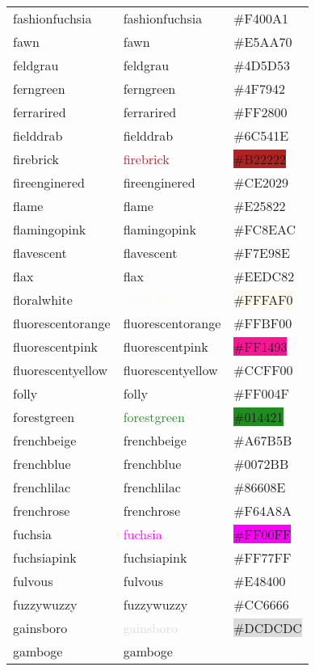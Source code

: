 \documentclass[
]{article}
\begin{document}
\begin{longtable}[]{@{}lll@{}}
fashionfuchsia & \textcolor{fashionfuchsia}{fashionfuchsia} &
\colorbox{fashionfuchsia}{\#F400A1}\tabularnewline
fawn & \textcolor{fawn}{fawn} & \colorbox{fawn}{\#E5AA70}\tabularnewline
feldgrau & \textcolor{feldgrau}{feldgrau} &
\colorbox{feldgrau}{\#4D5D53}\tabularnewline
ferngreen & \textcolor{ferngreen}{ferngreen} &
\colorbox{ferngreen}{\#4F7942}\tabularnewline
ferrarired & \textcolor{ferrarired}{ferrarired} &
\colorbox{ferrarired}{\#FF2800}\tabularnewline
fielddrab & \textcolor{fielddrab}{fielddrab} &
\colorbox{fielddrab}{\#6C541E}\tabularnewline
firebrick & \textcolor{firebrick}{firebrick} &
\colorbox{firebrick}{\#B22222}\tabularnewline
fireenginered & \textcolor{fireenginered}{fireenginered} &
\colorbox{fireenginered}{\#CE2029}\tabularnewline
flame & \textcolor{flame}{flame} &
\colorbox{flame}{\#E25822}\tabularnewline
flamingopink & \textcolor{flamingopink}{flamingopink} &
\colorbox{flamingopink}{\#FC8EAC}\tabularnewline
flavescent & \textcolor{flavescent}{flavescent} &
\colorbox{flavescent}{\#F7E98E}\tabularnewline
flax & \textcolor{flax}{flax} & \colorbox{flax}{\#EEDC82}\tabularnewline
floralwhite & \textcolor{floralwhite}{floralwhite} &
\colorbox{floralwhite}{\#FFFAF0}\tabularnewline
fluorescentorange & \textcolor{fluorescentorange}{fluorescentorange} &
\colorbox{amber}{\#FFBF00}\tabularnewline
fluorescentpink & \textcolor{fluorescentpink}{fluorescentpink} &
\colorbox{deeppink}{\#FF1493}\tabularnewline
fluorescentyellow & \textcolor{fluorescentyellow}{fluorescentyellow} &
\colorbox{electriclime}{\#CCFF00}\tabularnewline
folly & \textcolor{folly}{folly} &
\colorbox{folly}{\#FF004F}\tabularnewline
forestgreen & \textcolor{forestgreen}{forestgreen} &
\colorbox{forestgreen}{\#014421}\tabularnewline
frenchbeige & \textcolor{frenchbeige}{frenchbeige} &
\colorbox{frenchbeige}{\#A67B5B}\tabularnewline
frenchblue & \textcolor{frenchblue}{frenchblue} &
\colorbox{frenchblue}{\#0072BB}\tabularnewline
frenchlilac & \textcolor{frenchlilac}{frenchlilac} &
\colorbox{frenchlilac}{\#86608E}\tabularnewline
frenchrose & \textcolor{frenchrose}{frenchrose} &
\colorbox{frenchrose}{\#F64A8A}\tabularnewline
fuchsia & \textcolor{fuchsia}{fuchsia} &
\colorbox{fuchsia}{\#FF00FF}\tabularnewline
fuchsiapink & \textcolor{fuchsiapink}{fuchsiapink} &
\colorbox{fuchsiapink}{\#FF77FF}\tabularnewline
fulvous & \textcolor{fulvous}{fulvous} &
\colorbox{fulvous}{\#E48400}\tabularnewline
fuzzywuzzy & \textcolor{fuzzywuzzy}{fuzzywuzzy} &
\colorbox{fuzzywuzzy}{\#CC6666}\tabularnewline
gainsboro & \textcolor{gainsboro}{gainsboro} &
\colorbox{gainsboro}{\#DCDCDC}\tabularnewline
gamboge & \textcolor{gamboge}{gamboge} &

\end{longtable}
\end{document}

